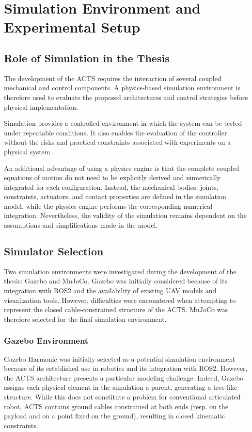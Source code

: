 \chapter{Simulation Environment and Experimental Setup}
\label{chap:simulation}
\section{Role of Simulation in the Thesis}
The development of the ACTS requires the interaction of several coupled mechanical and control components. A physics-based simulation environment is therefore used to evaluate the proposed architectures and control strategies before physical implementation.

Simulation provides a controlled environment in which the system can be tested under repeatable conditions. It also enables the evaluation of the controller without the risks and practical constraints associated with experiments on a physical system.

An additional advantage of using a physics engine is that the complete coupled equations of motion do not need to be explicitly derived and numerically integrated for each configuration. Instead, the mechanical bodies, joints, constraints, actuators, and contact properties are defined in the simulation model, while the physics engine performs the corresponding numerical integration. Nevertheless, the validity of the simulation remains dependent on the assumptions and simplifications made in the model.

\section{Simulator Selection}

Two simulation environments were investigated during the development of the thesis: Gazebo and MuJoCo. Gazebo was initially considered because of its integration with ROS2 and the availability of existing UAV models and visualization tools. However, difficulties were encountered when attempting to represent the closed cable-constrained structure of the ACTS. MuJoCo was therefore selected for the final simulation environment.

\subsection{Gazebo Environment}
Gazebo Harmonic \cite{gazebo_harmonic_getstarted} was initially selected as a potential simulation environment because of its established use in robotics and its integration with ROS2. However, the ACTS architecture presents a particular modeling challenge. Indeed, Gazebo assigns each physical element in the simulation a parent, generating a tree-like structure. While this does not constitute a problem for conventional articulated robot, ACTS contains ground cables constrained at both ends (resp. on the payload and on a point fixed on the ground), resulting in closed kinematic constraints. 

